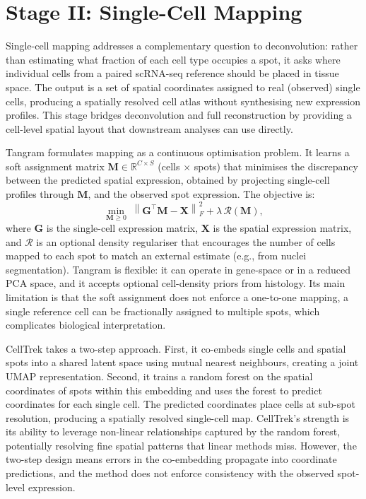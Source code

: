 \section{Stage II: Single-Cell Mapping}
\label{sec:stage2}

Single-cell mapping addresses a complementary question to deconvolution: rather than estimating what fraction of each cell type occupies a spot, it asks where individual cells from a paired scRNA-seq reference should be placed in tissue space. The output is a set of spatial coordinates assigned to real (observed) single cells, producing a spatially resolved cell atlas without synthesising new expression profiles. This stage bridges deconvolution and full reconstruction by providing a cell-level spatial layout that downstream analyses can use directly.

Tangram \citep{biancalani2021deep} formulates mapping as a continuous optimisation problem. It learns a soft assignment matrix $\mathbf{M} \in \mathbb{R}^{C \times S}$ (cells $\times$ spots) that minimises the discrepancy between the predicted spatial expression, obtained by projecting single-cell profiles through $\mathbf{M}$, and the observed spot expression. The objective is:
\begin{equation}
  \min_{\mathbf{M} \geq 0} \; \left\| \mathbf{G}^\top \mathbf{M} - \mathbf{X} \right\|_F^2 + \lambda\,\mathcal{R}(\mathbf{M}),
\end{equation}
where $\mathbf{G}$ is the single-cell expression matrix, $\mathbf{X}$ is the spatial expression matrix, and $\mathcal{R}$ is an optional density regulariser that encourages the number of cells mapped to each spot to match an external estimate (e.g., from nuclei segmentation). Tangram is flexible: it can operate in gene-space or in a reduced PCA space, and it accepts optional cell-density priors from histology. Its main limitation is that the soft assignment does not enforce a one-to-one mapping, a single reference cell can be fractionally assigned to multiple spots, which complicates biological interpretation.

CellTrek \citep{wei2022celltrek} takes a two-step approach. First, it co-embeds single cells and spatial spots into a shared latent space using mutual nearest neighbours, creating a joint UMAP representation. Second, it trains a random forest on the spatial coordinates of spots within this embedding and uses the forest to predict coordinates for each single cell. The predicted coordinates place cells at sub-spot resolution, producing a spatially resolved single-cell map. CellTrek's strength is its ability to leverage non-linear relationships captured by the random forest, potentially resolving fine spatial patterns that linear methods miss. However, the two-step design means errors in the co-embedding propagate into coordinate predictions, and the method does not enforce consistency with the observed spot-level expression.

